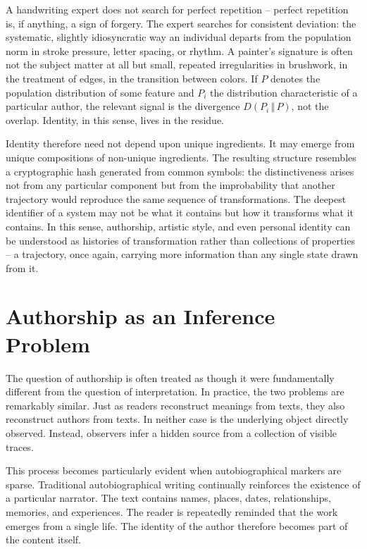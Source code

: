 \documentclass[11pt]{article}
\theoremstyle{plain}
\begin{document}
A handwriting expert does not search for perfect repetition -- perfect repetition is, if anything, a sign of forgery. The expert searches for consistent deviation: the systematic, slightly idiosyncratic way an individual departs from the population norm in stroke pressure, letter spacing, or rhythm. A painter's signature is often not the subject matter at all but small, repeated irregularities in brushwork, in the treatment of edges, in the transition between colors. If $P$ denotes the population distribution of some feature and $P_i$ the distribution characteristic of a particular author, the relevant signal is the divergence $D(P_i \,\Vert\, P)$, not the overlap. Identity, in this sense, lives in the residue.

Identity therefore need not depend upon unique ingredients. It may emerge from unique compositions of non-unique ingredients. The resulting structure resembles a cryptographic hash generated from common symbols: the distinctiveness arises not from any particular component but from the improbability that another trajectory would reproduce the same sequence of transformations. The deepest identifier of a system may not be what it contains but how it transforms what it contains. In this sense, authorship, artistic style, and even personal identity can be understood as histories of transformation rather than collections of properties -- a trajectory, once again, carrying more information than any single state drawn from it.

\section{Authorship as an Inference Problem}

The question of authorship is often treated as though it were fundamentally different from the question of interpretation. In practice, the two problems are remarkably similar. Just as readers reconstruct meanings from texts, they also reconstruct authors from texts. In neither case is the underlying object directly observed. Instead, observers infer a hidden source from a collection of visible traces.

This process becomes particularly evident when autobiographical markers are sparse. Traditional autobiographical writing continually reinforces the existence of a particular narrator. The text contains names, places, dates, relationships, memories, and experiences. The reader is repeatedly reminded that the work emerges from a single life. The identity of the author therefore becomes part of the content itself.
\end{document}

